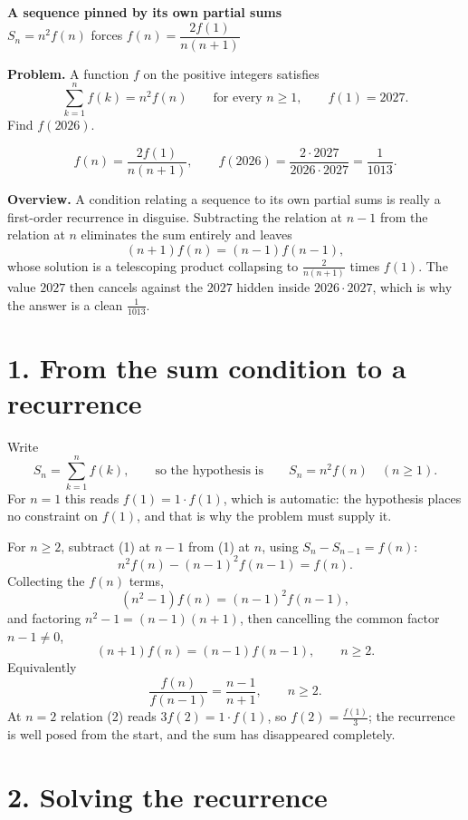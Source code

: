 \documentclass[12pt]{article}
\begin{document}
\begin{center}
{\Large\bfseries A sequence pinned by its own partial sums}\\[0.35em]
{\large \(S_n=n^2f(n)\) forces \(f(n)=\dfrac{2f(1)}{n(n+1)}\)}
\end{center}

\textbf{Problem.} A function \(f\) on the positive integers satisfies
\[
\sum_{k=1}^{n}f(k)=n^2f(n)\qquad\text{for every }n\ge1,
\qquad f(1)=2027 .
\]
Find \(f(2026)\).

\[
\boxed{\displaystyle
f(n)=\frac{2f(1)}{n(n+1)},
\qquad
f(2026)=\frac{2\cdot2027}{2026\cdot2027}=\frac1{1013}.}
\]

\textbf{Overview.}
A condition relating a sequence to its own partial sums is really a
first-order recurrence in disguise. Subtracting the relation at \(n-1\)
from the relation at \(n\) eliminates the sum entirely and leaves
\[
(n+1)f(n)=(n-1)f(n-1),
\]
whose solution is a telescoping product collapsing to
\(\frac{2}{n(n+1)}\) times \(f(1)\). The value \(2027\) then cancels
against the \(2027\) hidden inside \(2026\cdot2027\), which is why the
answer is a clean \(\frac1{1013}\).

\section*{1. From the sum condition to a recurrence}

Write
\[
S_n=\sum_{k=1}^{n}f(k),
\qquad\text{so the hypothesis is}\qquad
S_n=n^2f(n)\quad (n\ge1).
\tag{1}
\]
For \(n=1\) this reads \(f(1)=1\cdot f(1)\), which is automatic: the
hypothesis places no constraint on \(f(1)\), and that is why the problem
must supply it.

For \(n\ge2\), subtract (1) at \(n-1\) from (1) at \(n\), using
\(S_n-S_{n-1}=f(n)\):
\[
n^2f(n)-(n-1)^2f(n-1)=f(n).
\]
Collecting the \(f(n)\) terms,
\[
(n^2-1)f(n)=(n-1)^2f(n-1),
\]
and factoring \(n^2-1=(n-1)(n+1)\), then cancelling the common factor
\(n-1\ne0\),
\[
\boxed{\displaystyle (n+1)f(n)=(n-1)f(n-1),\qquad n\ge2 .}
\tag{2}
\]
Equivalently
\[
\frac{f(n)}{f(n-1)}=\frac{n-1}{n+1},\qquad n\ge2 .
\tag{3}
\]
At \(n=2\) relation (2) reads \(3f(2)=1\cdot f(1)\), so
\(f(2)=\frac{f(1)}{3}\); the recurrence is well posed from the start,
and the sum has disappeared completely.

\section*{2. Solving the recurrence}
\end{document}
